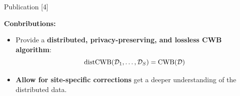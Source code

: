 \documentclass[t,10pt]{beamer}
\begin{document}

\begin{frame}{Publication [4]}
  \vspace{-0.2cm}
  \begin{figure}
    \centering
  \end{figure}
  \vspace{-0.2cm}
  \textbf{Conbributions:}
  \begin{itemize}
    \item
      Provide a \textbf{distributed, privacy-preserving, and lossless CWB algorithm}: \[\operatorname{distCWB}(\mathcal{D}_1, \dots, \mathcal{D}_S) = \operatorname{CWB}(\mathcal{D})\]
    \item
      \textbf{Allow for site-specific corrections} get a deeper understanding of the distributed data.
  \end{itemize}

\end{frame}
\end{document}
